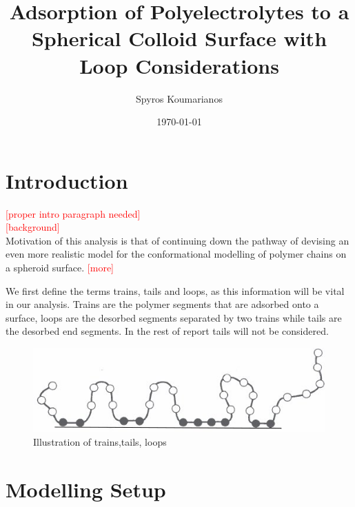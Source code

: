 \documentclass[10pt,letterpaper]{article}
\title{Adsorption of Polyelectrolytes to a Spherical Colloid Surface with Loop Considerations}
\author{Spyros Koumarianos}
\date{\today}
\begin{document}
\maketitle

\newpage

\section*{Introduction}
\noindent \textcolor{red}{[proper intro paragraph needed]}\\

\noindent \textcolor{red}{[background]}\\

Motivation of this analysis is that of continuing down the pathway of devising an even more realistic model for the conformational modelling of polymer chains on a spheroid surface. \textcolor{red}{[more]}

We first define the  terms trains, tails and loops, as this information will be vital in our analysis. Trains are the polymer segments that are adsorbed onto a surface, loops are the  desorbed segments separated by two trains while tails are the desorbed end segments. In the rest of report tails will not be considered. 

\begin{figure}[H]
	\centering
	\includegraphics[scale=0.5]{Clipboard.png}
	\caption{Illustration of trains,tails, loops \cite{fleer1993polymers}}
	\label{fig:gull}
\end{figure}



\section*{Modelling Setup}
\end{document}
